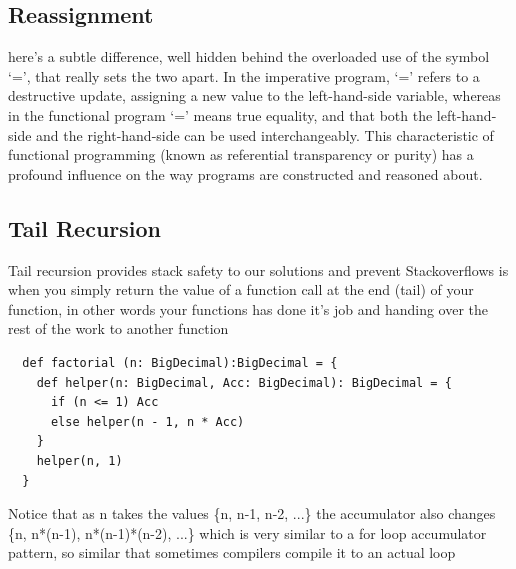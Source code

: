 \documentclass[12pt,twoside]{article}
\begin{document}
\subsection{Reassignment}
here's a subtle difference, well
hidden behind the overloaded use of the symbol
‘=’, that really sets the two apart. In the imperative
program, ‘=’ refers to a destructive update, assigning
a new value to the left-hand-side variable,
whereas in the functional program ‘=’ means true
equality, and that both the left-hand-side and the right-hand-side can be used interchangeably. This characteristic
of functional programming (known as referential
transparency or purity) has a profound influence
on the way programs are constructed and reasoned
about.




\subsection{Tail Recursion}
Tail recursion provides stack safety to our solutions and prevent Stackoverflows is when you simply return the value of a function call at the end (tail) of your function, in other words your functions has done it's job and handing over the rest of the work to another function
\begin{lstlisting}
  def factorial (n: BigDecimal):BigDecimal = {
    def helper(n: BigDecimal, Acc: BigDecimal): BigDecimal = {
      if (n <= 1) Acc
      else helper(n - 1, n * Acc)
    }
    helper(n, 1)
  }
\end{lstlisting}
Notice that as n takes the values \{n, n-1, n-2, ...\}
the accumulator also changes \{n, n*(n-1), n*(n-1)*(n-2), ...\}
which is very similar to a for loop accumulator pattern, so similar that sometimes compilers compile it to an actual loop
\end{document}

